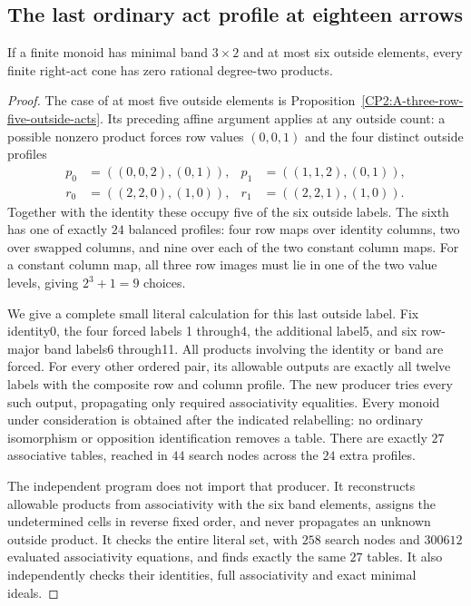 \subsection{The last ordinary act profile at eighteen arrows}

\begin{proposition}
\label{CP2:A-three-row-six-outside-acts}
If a finite monoid has minimal band $3\times2$ and
at most six outside elements, every finite right-act
cone has zero rational degree-two products.
\end{proposition}
\begin{proof}
The case of at most five outside elements is
Proposition~\ref{CP2:A-three-row-five-outside-acts}.
Its preceding affine argument applies at any outside
count: a possible nonzero product forces row values
$(0,0,1)$ and the four distinct outside profiles
\[
 \begin{aligned}
 p_0&=((0,0,2),(0,1)),& p_1&=((1,1,2),(0,1)),\\
 r_0&=((2,2,0),(1,0)),& r_1&=((2,2,1),(1,0)).
 \end{aligned}
\]
Together with the identity these occupy five of the
six outside labels. The sixth has one of exactly $24$
balanced profiles: four row maps over identity columns,
two over swapped columns, and nine over each of the
two constant column maps. For a constant column map,
all three row images must lie in one of the two value
levels, giving $2^3+1=9$ choices.

We give a complete small literal calculation for this
last outside label. Fix identity0, the four forced labels
1 through4, the additional label5, and six row-major
band labels6 through11. All products involving the
identity or band are forced. For every other ordered
pair, its allowable outputs are exactly all twelve
labels with the composite row and column profile.
The new producer 
tries every such output, propagating only required
associativity equalities. Every monoid under consideration
is obtained after the indicated relabelling: no ordinary
isomorphism or opposition identification removes a table.
There are exactly $27$ associative tables, reached in
$44$ search nodes across the $24$ extra profiles.

The independent program
does not import that producer. It reconstructs allowable
products from associativity with the six band elements,
assigns the undetermined cells in reverse fixed order,
and never propagates an unknown outside product. It
checks the entire literal set, with $258$ search nodes
and $300612$ evaluated associativity equations, and
finds exactly the same $27$ tables. It also independently
checks their identities, full associativity and exact
minimal ideals.


\end{proof}
